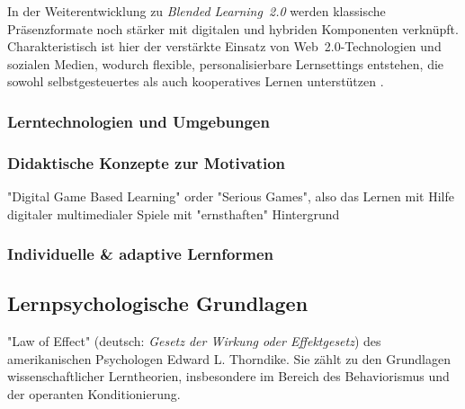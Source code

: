 In der Weiterentwicklung zu \textit{Blended Learning~2.0} werden klassische Präsenzformate noch stärker mit digitalen und hybriden Komponenten verknüpft. Charakteristisch ist hier der verstärkte Einsatz von Web~2.0-Technologien und sozialen Medien, wodurch flexible, personalisierbare Lernsettings entstehen, die sowohl selbstgesteuertes als auch kooperatives Lernen unterstützen \parencites{seufert_schulleitertagung_2014}{news_aktuell_gmbh_e-learning_2025}.


\subsubsection{Lerntechnologien und Umgebungen}




\subsubsection{Didaktische Konzepte zur Motivation}



"Digital Game Based Learning" order "Serious Games", also das Lernen mit Hilfe digitaler multimedialer Spiele mit "ernsthaften" Hintergrund \parencite[S.~14]{niegemann_kompendium_2008}

\subsubsection{Individuelle \& adaptive Lernformen}





\subsection{Lernpsychologische Grundlagen}

"Law of Effect" (deutsch: \textit{Gesetz der Wirkung oder Effektgesetz}) des amerikanischen Psychologen Edward L. Thorndike. Sie zählt zu den Grundlagen wissenschaftlicher Lerntheorien, insbesondere im Bereich des Behaviorismus und der operanten Konditionierung.




